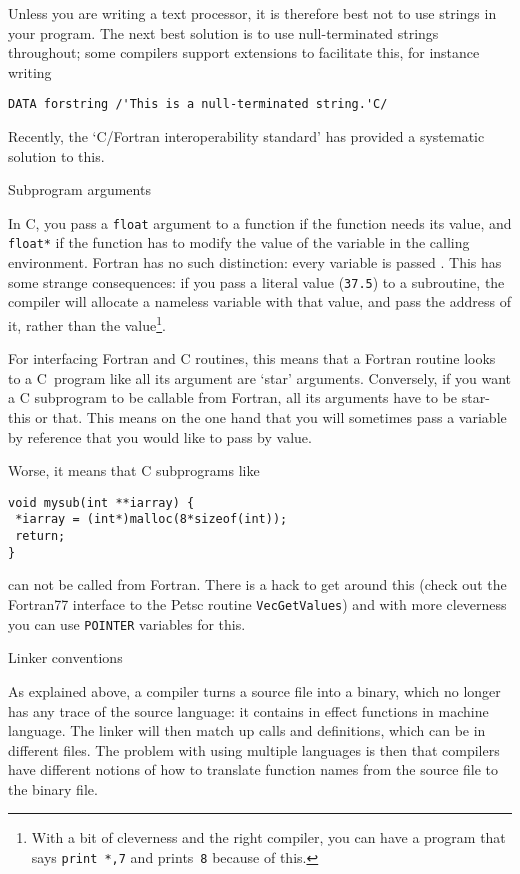 Unless you are writing a text processor, it is therefore best not to
use strings in your program. The next best solution is to use
null-terminated strings throughout; some compilers support extensions
to facilitate this, for instance writing
\begin{verbatim}
DATA forstring /'This is a null-terminated string.'C/
\end{verbatim}

Recently, the `C/Fortran interoperability standard' has
provided a systematic solution to this.

 {Subprogram arguments}

In C, you pass a \texttt{float} argument to a function if the function
needs its value, and \texttt{float*} if the function has to modify the
value of the variable in the calling environment. Fortran has no such
distinction: every variable is passed . This
has some strange consequences: if you pass a literal value
(\texttt{37.5}) to a subroutine, the compiler will allocate a nameless
variable with that value, and pass the address of it, rather than the
value\footnote{With a bit of cleverness and the right compiler, you
  can have a program that says \texttt{print *,7} and
  prints~\texttt{8} because of this.}.

For interfacing Fortran and C routines, this means that a Fortran
routine looks to a C~program like all its argument are `star'
arguments. Conversely, if you want a C subprogram to be callable from
Fortran, all its arguments have to be star-this or that. This means on
the one hand that you will sometimes pass a variable by reference that
you would like to pass by value.

Worse, it means that C subprograms like
\begin{verbatim}
void mysub(int **iarray) {
 *iarray = (int*)malloc(8*sizeof(int));
 return;
}
\end{verbatim}
can not be called from Fortran. There is a hack to get around this
(check out the Fortran77 interface to the Petsc routine
\texttt{VecGetValues}) and with more cleverness you can use
\texttt{POINTER} variables for this.

 {Linker conventions}

As explained above, a compiler turns a source file into a binary,
which no longer has any trace of the source language: it contains in
effect functions in machine language. The linker will then match up
calls and definitions, which can be in different files. The problem
with using multiple languages is then that compilers have different
notions of how to translate function names from the source file to the
binary file.

